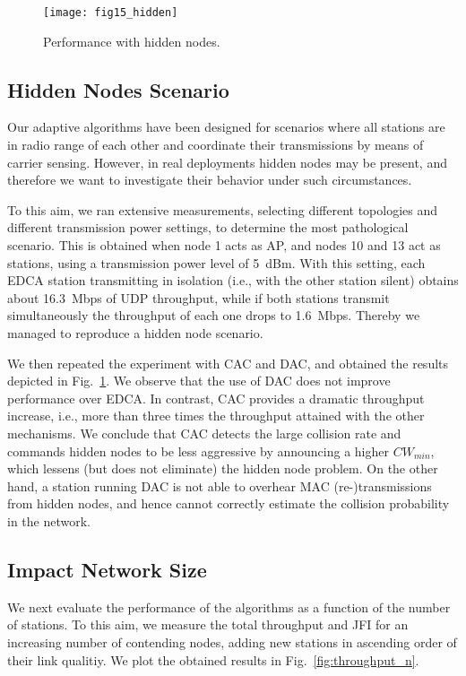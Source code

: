 \documentclass[a4paper,10pt]{article}
\begin{document}
\begin{figure}\texttt{[image: fig15\_hidden]}\caption{Performance with hidden nodes.}\label{fig:hidden}\end{figure}

\subsection{Hidden Nodes Scenario}
\label{sec:hidden}

Our adaptive algorithms have been designed for scenarios where all stations are in radio range of each other and coordinate their transmissions by means of carrier sensing. However, in real deployments hidden nodes may be present, and therefore we want to investigate their behavior under such circumstances. 

To this aim, we ran extensive measurements, selecting different topologies and different transmission power settings, to determine the most pathological scenario. This is obtained when node 1 acts as AP, and nodes 10 and 13 act as stations, using a transmission power level of 5~dBm. With this setting, each EDCA station transmitting in isolation (i.e., with the other station silent) obtains about 16.3~Mbps of UDP throughput, while if both stations transmit simultaneously the throughput of each one drops to 1.6~Mbps. Thereby we managed to reproduce a hidden node scenario.

We then repeated the experiment with CAC and DAC, and obtained the results depicted in Fig.~\ref{fig:hidden}. We observe that the use of DAC does not improve performance over EDCA. In contrast, CAC provides a dramatic throughput increase, i.e., more than three times the throughput attained with the other mechanisms. We conclude that CAC detects the large collision rate and commands hidden nodes to be less aggressive by announcing a higher $CW_{min}$, which lessens (but does not eliminate) the hidden node problem. On the other hand, a station running DAC is not able to overhear MAC (re-)transmissions from hidden nodes, and hence cannot correctly estimate the collision probability in the network.

\subsection{Impact Network Size}

We next evaluate the performance of the algorithms as a function of the number of stations. To this aim, we measure the total throughput and JFI for an increasing number of contending nodes, adding new stations in ascending order of their link qualitiy. We plot the obtained results in Fig.~\ref{fig:throughput_n}.
\end{document}
